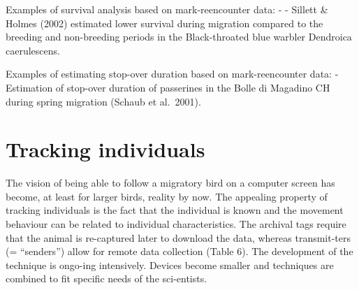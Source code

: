 \documentclass[
]{book}
\begin{document}
Examples of survival analysis based on mark-reencounter data:
- - Sillett \& Holmes (2002) estimated lower survival during migration compared to the breeding and non-breeding periods in the Black-throated blue warbler Dendroica caerulescens.

Examples of estimating stop-over duration based on mark-reencounter data:
- Estimation of stop-over duration of passerines in the Bolle di Magadino CH during spring migration (Schaub et al.~2001).

\hypertarget{tracking-individuals}{%
\section{Tracking individuals}\label{tracking-individuals}}

The vision of being able to follow a migratory bird on a computer screen has become, at least for larger birds, reality by now. The appealing property of tracking individuals is the fact that the individual is known and the movement behaviour can be related to individual characteristics.
The archival tags require that the animal is re-captured later to download the data, whereas transmit-ters (= ``senders'') allow for remote data collection (Table 6). The development of the technique is ongo-ing intensively. Devices become smaller and techniques are combined to fit specific needs of the sci-entists.
\end{document}
